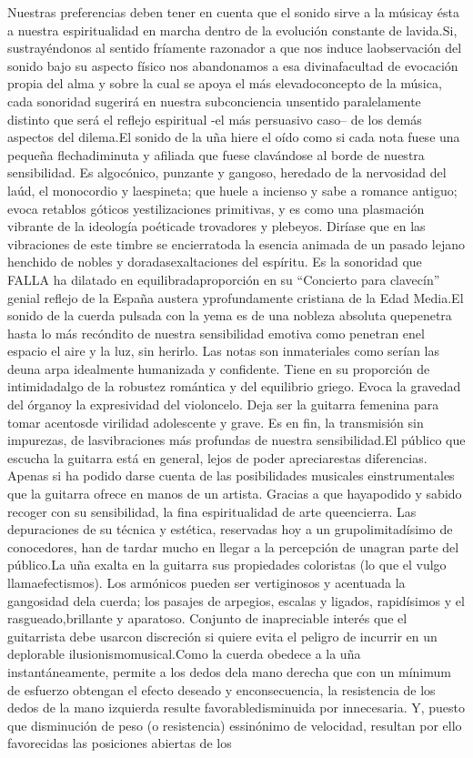 \documentclass[
10pt, %
a4paper, %
oneside, %
headinclude,footinclude, %
BCOR5mm, %
]{scrartcl}
\begin{document}
{Nuestras preferencias deben tener en cuenta que el sonido sirve a la músicay ésta a nuestra espiritualidad en marcha dentro de la evolución constante de lavida.Si, sustrayéndonos al sentido fríamente razonador a que nos induce laobservación del sonido bajo su aspecto físico nos abandonamos a esa divinafacultad de evocación propia del alma y sobre la cual se apoya el más elevadoconcepto de la música, cada sonoridad sugerirá en nuestra subconciencia unsentido paralelamente distinto que será el reflejo espiritual -el más persuasivo caso– de los demás aspectos del dilema.El sonido de la uña hiere el oído como si cada nota fuese una pequeña flechadiminuta y afiliada que fuese clavándose al borde de nuestra sensibilidad. Es algocónico, punzante y gangoso, heredado de la nervosidad del laúd, el monocordio y laespineta; que huele a incienso y sabe a romance antiguo; evoca retablos góticos yestilizaciones primitivas, y es como una plasmación vibrante de la ideología poéticade trovadores y plebeyos. Diríase que en las vibraciones de este timbre se encierratoda la esencia animada de un pasado lejano henchido de nobles y doradasexaltaciones del espíritu. Es la sonoridad que FALLA ha dilatado en equilibradaproporción en su “Concierto para clavecín” genial reflejo de la España austera yprofundamente cristiana de la Edad Media.El sonido de la cuerda pulsada con la yema es de una nobleza absoluta quepenetra hasta lo más recóndito de nuestra sensibilidad emotiva como penetran enel espacio el aire y la luz, sin herirlo. Las notas son inmateriales como serían las deuna arpa idealmente humanizada y confidente. Tiene en su proporción de intimidadalgo de la robustez romántica y del equilibrio griego. Evoca la gravedad del órganoy la expresividad del violoncelo. Deja ser la guitarra femenina para tomar acentosde virilidad adolescente y grave. Es en fin, la transmisión sin impurezas, de lasvibraciones más profundas de nuestra sensibilidad.El público que escucha la guitarra está en general, lejos de poder apreciarestas diferencias. Apenas si ha podido darse cuenta de las posibilidades musicales einstrumentales que la guitarra ofrece en manos de un artista. Gracias a que hayapodido y sabido recoger con su sensibilidad, la fina espiritualidad de arte queencierra. Las depuraciones de su técnica y estética, reservadas hoy a un grupolimitadísimo de conocedores, han de tardar mucho en llegar a la percepción de unagran parte del público.La uña exalta en la guitarra sus propiedades coloristas (lo que el vulgo llamaefectismos). Los armónicos pueden ser vertiginosos y acentuada la gangosidad dela cuerda; los pasajes de arpegios, escalas y ligados, rapidísimos y el rasgueado,brillante y aparatoso. Conjunto de inapreciable interés que el guitarrista debe usarcon discreción si quiere evita el peligro de incurrir en un deplorable ilusionismomusical.Como la cuerda obedece a la uña instantáneamente, permite a los dedos dela mano derecha que con un mínimum de esfuerzo obtengan el efecto deseado y enconsecuencia, la resistencia de los dedos de la mano izquierda resulte favorabledisminuida por innecesaria. Y, puesto que disminución de peso (o resistencia) essinónimo de velocidad, resultan por ello favorecidas las posiciones abiertas de los  
}
\end{document}
